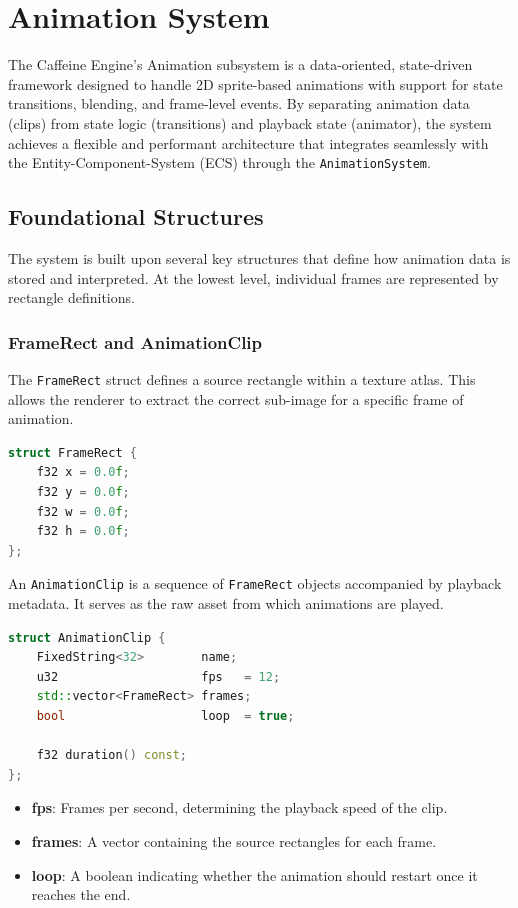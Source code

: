 \chapter{Animation System}

The Caffeine Engine's Animation subsystem is a data-oriented, state-driven framework designed to handle 2D sprite-based animations with support for state transitions, blending, and frame-level events. By separating animation data (clips) from state logic (transitions) and playback state (animator), the system achieves a flexible and performant architecture that integrates seamlessly with the Entity-Component-System (ECS) through the \texttt{AnimationSystem}.

\section{Foundational Structures}

The system is built upon several key structures that define how animation data is stored and interpreted. At the lowest level, individual frames are represented by rectangle definitions.

\subsection{FrameRect and AnimationClip}

The \texttt{FrameRect} struct defines a source rectangle within a texture atlas. This allows the renderer to extract the correct sub-image for a specific frame of animation.

\begin{lstlisting}[language=C++]
struct FrameRect {
    f32 x = 0.0f;
    f32 y = 0.0f;
    f32 w = 0.0f;
    f32 h = 0.0f;
};
\end{lstlisting}

An \texttt{AnimationClip} is a sequence of \texttt{FrameRect} objects accompanied by playback metadata. It serves as the raw asset from which animations are played.

\begin{lstlisting}[language=C++]
struct AnimationClip {
    FixedString<32>        name;
    u32                    fps   = 12;
    std::vector<FrameRect> frames;
    bool                   loop  = true;

    f32 duration() const;
};
\end{lstlisting}

\begin{itemize}
    \item \textbf{fps}: Frames per second, determining the playback speed of the clip.
    \item \textbf{frames}: A vector containing the source rectangles for each frame.
    \item \textbf{loop}: A boolean indicating whether the animation should restart once it reaches the end.
\end{itemize}

